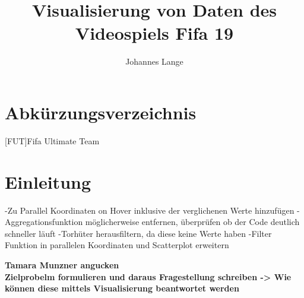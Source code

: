 \documentclass[usegeometry=true]{scrartcl}
\begin{document}
\subject{Projektbericht zum Modul Information Retrieval und Visualisierung Sommersemester 2021}
\title{Visualisierung von Daten des Videospiels Fifa 19}
\author{Johannes Lange}%
\maketitle%
%
\newpage
\tableofcontents
\newpage

\section*{Abkürzungsverzeichnis}
	\begin{acronym}
	[FUT]{Fifa Ultimate Team}
	\end{acronym}
\newpage

\section{Einleitung}
 -Zu Parallel Koordinaten on Hover inklusive der verglichenen Werte hinzufügen
 -Aggregationsfunktion möglicherweise entfernen, überprüfen ob der Code deutlich schneller läuft
 -Torhüter herausfiltern, da diese keine Werte haben
 -Filter Funktion in parallelen Koordinaten und Scatterplot erweitern

\textbf{Tamara Munzner angucken}\\
\textbf{Zielprobelm formulieren und daraus Fragestellung schreiben -> Wie können diese mittels Visualisierung beantwortet werden}
\end{document}
